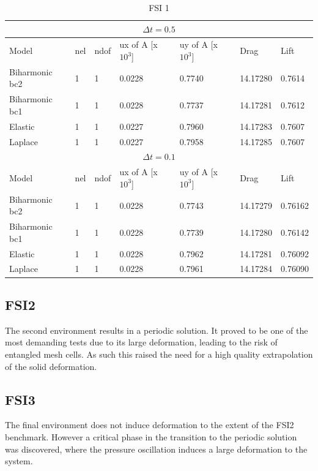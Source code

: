 \begin{table}[h!]
\centering
\caption{FSI 1}
\label{my-label}
\begin{tabular}{ |p{2.5cm}||p{1cm}|p{1cm}|p{2.3cm}|p{2.3cm}|p{1.2cm}|p{1.2cm}|}
 \hline
  \multicolumn{7}{|c|}{$\Delta t = 0.5$} \\
   \hline
 Model & nel & ndof & ux of A [x $10^{3}$]  &uy of A [x $10^{3}$]& Drag  & Lift \\
 \hline
Biharmonic bc2 & 1 &1 & 0.0228  &  0.7740  & 14.17280  &  0.7614 \\
 \hline
Biharmonic bc1 & 1 &1 & 0.0228 &   0.7737  & 14.17281 &  0.7612  \\
 \hline
Elastic        & 1 &1 & 0.0227  &  0.7960  & 14.17283 &  0.7607  \\
 \hline
Laplace        & 1 &1 & 0.0227  &  0.7958  & 14.17285 &  0.7607   \\
 \hline
  \multicolumn{7}{|c|}{$\Delta t = 0.1$} \\
   \hline
 Model & nel & ndof & ux of A [x $10^{3}$]  &uy of A [x $10^{3}$]& Drag  & Lift \\
 \hline
Biharmonic bc2 & 1 &1 & 0.0228 &  0.7743  & 14.17279 & 0.76162  \\
 \hline
Biharmonic bc1 & 1 &1 & 0.0228  &  0.7739 & 14.17280 & 0.76142 \\
 \hline
Elastic       & 1 &1 & 0.0228  &  0.7962  & 14.17281 & 0.76092 \\
 \hline
Laplace        & 1 &1 & 0.0228  & 0.7961  & 14.17284 & 0.76090 \\
\hline
\end{tabular}
\end{table}

\subsection{FSI2}
The second environment results in a periodic solution. It proved to be one of the most demanding tests due to its large deformation, leading to the risk of entangled mesh cells. As such this raised the need for a high quality extrapolation of the solid deformation.
\\
\subsection{FSI3}    
The final environment does not induce deformation to the extent of the FSI2 benchmark. However a critical phase in the transition to the periodic solution was discovered, where the pressure oscillation induces a large deformation to the system. 

